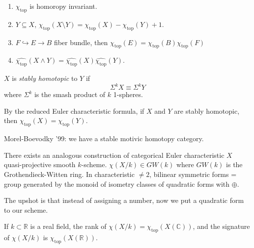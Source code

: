 \begin{proposition}
\label{proposition-properties-of-euler}
\begin{enumerate}
\item $\chi_{\operatorname{top}}$
is homoropy invariant.
\item $Y \subseteq X$,
$\chi_{\operatorname{top}}(X\setminus Y)
=\chi_{\operatorname{top}}(X)
-\chi_{\operatorname{top}}(Y)+1$.
\item $F \hookrightarrow E \to B$ fiber
bundle, then $\chi_{\operatorname{top}}(E) =
\chi_{\operatorname{top}}(B)
\chi_{\operatorname{top}}(F)$

\item $\hat{\chi_{\operatorname{top}}}(X
\wedge Y) =
\hat{\chi_{\operatorname{top}}}(X)
\hat{\chi_{\operatorname{top}}}(Y)$.
\end{enumerate}
\end{proposition}

\begin{definition}
\label{definition-stably-homotopic}
$X$ is {\it stably homotopic} to $Y$
if
$$
\Sigma^kX \equiv \Sigma^kY
$$
where $\Sigma^k$ is the smash product
of $k$ 1-spheres.
\end{definition}

\noindent
By the reduced Euler characteristic formula,
if $X$ and $Y$ are stably homotopic,
then $\chi_{\operatorname{top}}(X)
=\chi_{\operatorname{top}}(Y)$.

\medskip\noindent
Morel-Boevodky '99: we have
a stable motivic homotopy category.

There exists an analogous construction
of categorical Euler characteristic
$X$ quasi-projective smooth $k$-scheme.
$\chi(X/k) \in GW(k)$
where $GW(k)$ is the Grothendieck-Witten
ring. In characteristic $\neq 2$, 
bilinear symmetric forms = group
generated by the monoid of isometry
classes of quadratic forms with $\oplus$.

The upshot is that instead
of assigning a number, now we put
a quadratic form to our scheme.

\begin{remark}
\label{remark-real-field-euler}
If $k \subset \mathbb{R}$ is a real field,
the rank of $\chi(X/k) =
\chi_{\operatorname{top}}(X(\mathbb{C}))$,
and the signature of $\chi(X/k)$
is
$\chi_{\operatorname{top}}(X(\mathbb{R}))$.
\end{remark}

